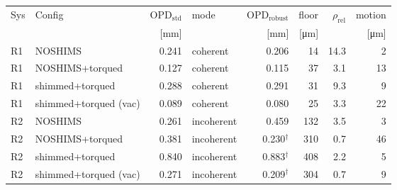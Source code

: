 \begin{tabular}{llrlrrrr}
\toprule
Sys & Config & $\mathrm{OPD}_{\text{std}}$ & mode & $\mathrm{OPD}_{\text{robust}}$ & floor & $\rho_{\text{rel}}$ & motion \\
 & & [mm] & & [mm] & [\si{\micro m}] & & [\si{\micro m}] \\
\midrule
R1 & NOSHIMS & 0.241 & coherent & 0.206 & 14 & 14.3 & 2 \\
R1 & NOSHIMS+torqued & 0.127 & coherent & 0.115 & 37 & 3.1 & 13 \\
R1 & shimmed+torqued & 0.288 & coherent & 0.291 & 31 & 9.3 & 9 \\
R1 & shimmed+torqued (vac) & 0.089 & coherent & 0.080 & 25 & 3.3 & 22 \\
R2 & NOSHIMS & 0.261 & incoherent & 0.459 & 132 & 3.5 & 3 \\
R2 & NOSHIMS+torqued & 0.381 & incoherent & 0.230$^{\dagger}$ & 310 & 0.7 & 46 \\
R2 & shimmed+torqued & 0.840 & incoherent & 0.883$^{\dagger}$ & 408 & 2.2 & 5 \\
R2 & shimmed+torqued (vac) & 0.271 & incoherent & 0.209$^{\dagger}$ & 304 & 0.7 & 9 \\
\bottomrule
\end{tabular}
